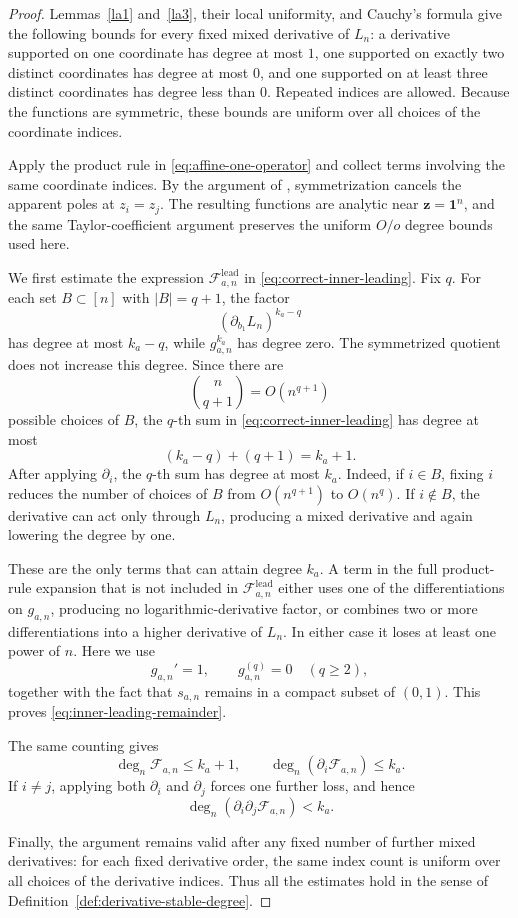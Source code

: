 \documentclass[11pt]{amsart}
\theoremstyle{plain}
\numberwithin{equation}{section}
\numberwithin{theorem}{section}
\numberwithin{figure}{section}
\begin{document}
\begin{proof}
Lemmas~\ref{la1} and~\ref{la3}, their local uniformity, and Cauchy's
formula give the following bounds for every fixed mixed derivative of
\(L_n\): a derivative supported on one coordinate has degree at most
\(1\), one supported on exactly two distinct coordinates has degree at
most \(0\), and one supported on at least three distinct coordinates
has degree less than \(0\). Repeated indices are allowed. Because the
functions are symmetric, these bounds are uniform over all choices of
the coordinate indices.

Apply the product rule in \eqref{eq:affine-one-operator} and collect
terms involving the same coordinate indices. By the argument of
\cite[Lemma~5.2]{bg16}, symmetrization cancels the apparent poles at
\(z_i=z_j\). The resulting functions are analytic near
\(\mathbf z=\mathbf1^n\), and the same Taylor-coefficient argument
preserves the uniform \(O/o\) degree bounds used here.

We first estimate the expression
\(\mathcal F^{\mathrm{lead}}_{a,n}\) in
\eqref{eq:correct-inner-leading}. Fix \(q\). For each set
\(B\subset[n]\) with \(|B|=q+1\), the factor
\[
    (\partial_{b_1}L_n)^{k_a-q}
\]
has degree at most \(k_a-q\), while \(g_{a,n}^{k_a}\) has degree
zero. The symmetrized quotient does not increase this degree. Since
there are
\[
    \binom{n}{q+1}=O(n^{q+1})
\]
possible choices of \(B\), the \(q\)-th sum in
\eqref{eq:correct-inner-leading} has degree at most
\[
    (k_a-q)+(q+1)=k_a+1.
\]
After applying \(\partial_i\), the \(q\)-th sum has degree at most
\(k_a\). Indeed, if \(i\in B\), fixing \(i\) reduces the number of
choices of \(B\) from \(O(n^{q+1})\) to \(O(n^q)\). If \(i\notin B\),
the derivative can act only through \(L_n\), producing a mixed
derivative and again lowering the degree by one.

These are the only terms that can attain degree \(k_a\). A term in the
full product-rule expansion that is not included in
\(\mathcal F^{\mathrm{lead}}_{a,n}\) either uses one of the
differentiations on \(g_{a,n}\), producing no logarithmic-derivative
factor, or combines two or more differentiations into a higher
derivative of \(L_n\). In either case it loses at least one power of
\(n\). Here we use
\[
    g_{a,n}'=1,
    \qquad
    g_{a,n}^{(q)}=0\quad(q\geq2),
\]
together with the fact that \(s_{a,n}\) remains in a compact subset of
\((0,1)\). This proves \eqref{eq:inner-leading-remainder}.

The same counting gives
\[
    \deg_n\mathcal F_{a,n}\leq k_a+1,
    \qquad
    \deg_n(\partial_i\mathcal F_{a,n})\leq k_a.
\]
If \(i\ne j\), applying both \(\partial_i\) and \(\partial_j\) forces
one further loss, and hence
\[
    \deg_n(\partial_i\partial_j\mathcal F_{a,n})<k_a.
\]

Finally, the argument remains valid after any fixed number of further
mixed derivatives: for each fixed derivative order, the same index
count is uniform over all choices of the derivative indices. Thus all
the estimates hold in the sense of
Definition~\ref{def:derivative-stable-degree}.
\end{proof}
\endgroup
\end{document}
